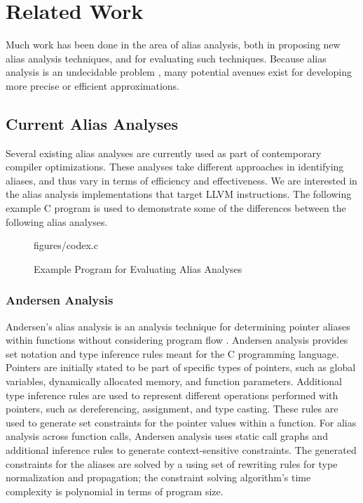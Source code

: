 \chapter{Related Work}

Much work has been done in the area of alias analysis, both in proposing new alias analysis techniques, and for evaluating such techniques. Because alias analysis is an undecidable problem \cite{undecidable}, many potential avenues exist for developing more precise or efficient approximations.

\section{Current Alias Analyses}
Several existing alias analyses are currently used as part of contemporary compiler optimizations. These analyses take different approaches in identifying aliases, and thus vary in terms of efficiency and effectiveness. We are interested in the alias analysis implementations that target LLVM instructions. The following example C program is used to demonstrate some of the differences between the following alias analyses.

\begin{figure} [h]
    {figures/codex.c}
   \caption{Example Program for Evaluating Alias Analyses}
   \label{fig:codex}
\end{figure}

\subsection{Andersen Analysis}
Andersen's alias analysis is an analysis technique for determining pointer aliases within functions without considering program flow \cite{Andersen}. Andersen analysis provides set notation and type inference rules meant for the C programming language. Pointers are initially stated to be part of specific types of pointers, such as global variables, dynamically allocated memory, and function parameters. Additional type inference rules are used to represent different operations performed with pointers, such as dereferencing, assignment, and type casting. These rules are used to generate set constraints for the pointer values within a function. For alias analysis across function calls, Andersen analysis uses static call graphs and additional inference rules to generate context-sensitive constraints. The generated constraints for the aliases are solved by a using set of rewriting rules for type normalization and propagation; the constraint solving algorithm's time complexity is polynomial in terms of program size.

